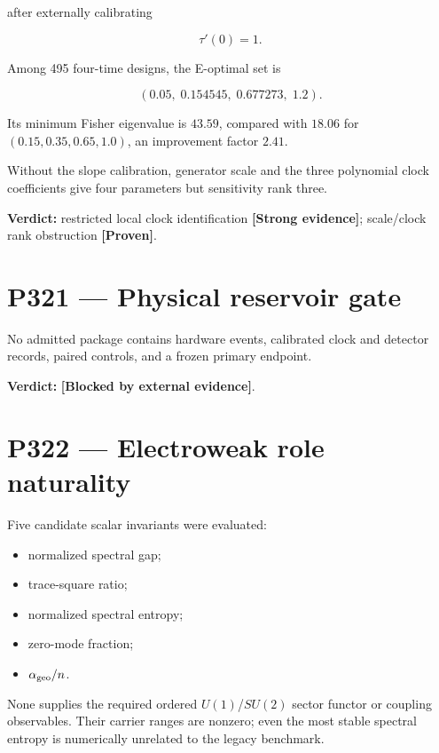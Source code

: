 \documentclass[11pt,a4paper,openany]{report}
\newcommand{\statusProven}{\textcolor{fingreen}{[Proven]}}
\newcommand{\statusStrong}{\textcolor{finblue}{[Strong evidence]}}
\begin{document}
after externally calibrating

\[
\tau'(0)=1.
\]

Among 495 four-time designs, the E-optimal set is

\[
(0.05,\;0.154545,\;0.677273,\;1.2).
\]

Its minimum Fisher eigenvalue is \(43.59\), compared with \(18.06\) for \((0.15,0.35,0.65,1.0)\), an improvement factor \(2.41\).

Without the slope calibration, generator scale and the three polynomial clock coefficients give four parameters but sensitivity rank three.

\textbf{Verdict:} restricted local clock identification \textbf{\statusStrong{}}; scale/\allowbreak{}clock rank obstruction \textbf{\statusProven{}}.

\section{P321 --- Physical reservoir gate}

No admitted package contains hardware events, calibrated clock and detector records, paired controls, and a frozen primary endpoint.

\textbf{Verdict:} \textbf{[Blocked by external evidence]}.

\section{P322 --- Electroweak role naturality}

Five candidate scalar invariants were evaluated:

\begin{itemize}
\item 
normalized spectral gap;

\item 
trace-square ratio;

\item 
normalized spectral entropy;

\item 
zero-mode fraction;

\item 
\(\alpha_{\rm geo}/n\).

\end{itemize}

None supplies the required ordered \(U(1)\)/\allowbreak{}\(SU(2)\) sector functor or coupling observables. Their carrier ranges are nonzero; even the most stable spectral entropy is numerically unrelated to the legacy benchmark.
\end{document}
